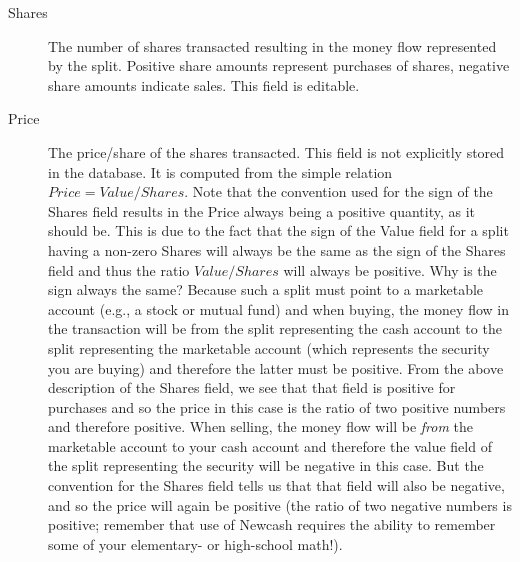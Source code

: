 \documentclass{report}
\begin{document}
\begin{description}
\begin{description}
\item[Shares] The number of shares transacted resulting in the money flow represented by the split. Positive share amounts represent purchases of shares, negative share amounts indicate sales. This field is editable.
\item[Price] The price/share of the shares transacted. This field is not explicitly stored in the database. It is computed from the simple relation $Price=Value/Shares$. Note that the convention used for the sign of the Shares field results in the Price always being a positive quantity, as it should be. This is due to the fact that the sign of the Value field for a split having a non-zero Shares will always be the same as the sign of the Shares field and thus the ratio $Value/Shares$ will always be positive. Why is the sign always the same? Because such a split must point to a marketable account (e.g., a stock or mutual fund) and when buying, the money flow in the transaction will be from the split representing the cash account to the split representing the marketable account (which represents the security you are buying) and therefore the latter must be positive. From the above description of the Shares field, we see that that field is positive for purchases and so the price in this case is the ratio of two positive numbers and therefore positive. When selling, the money flow will be \emph{from} the marketable account to your cash account and therefore the value field of the split representing the security will be negative in this case. But the convention for the Shares field tells us that that field will also be negative, and so the price will again be positive (the ratio of two negative numbers is positive; remember that use of Newcash requires the ability to remember some of your elementary- or high-school math!). 


\end{description}
\end{description}
\end{document}
